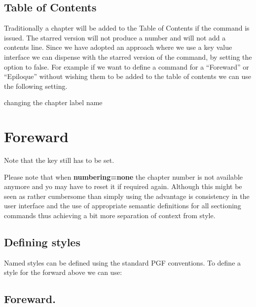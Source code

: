\section{Table of Contents}

Traditionally a chapter will be added to the Table of Contents if the  command is issued. The starred version will not produce a number and will not add a contents line. Since we have adopted an approach where we use a key value interface we can dispense with the starred version of the command, by setting the  option to false. For example if we want to define a command for a ``Foreward'' or ``Epiloque'' without wishing them to be added to the table of contents we can use the following setting.



\begin{texexample}{changing the chapter label name}{}
\chapter{Foreward}
\lorem
\end{texexample}

Note that the key  still has to be set.


Please note that when \textbf{numbering=none} the chapter number is not available anymore and yo may have to reset it if required again. Although this might be seen as rather cumbersome than simply using  the advantage is consistency in the user interface and the use of appropriate semantic definitions for all sectioning commands thus achieving a bit more separation of context from style.



\section{Defining styles}

Named styles can be defined using the standard \textsc{PGF} conventions. To define a style for the forward above we can use:

\begin{texexample}{}{}
\chapter{Foreward.}
\lorem
\end{texexample}



